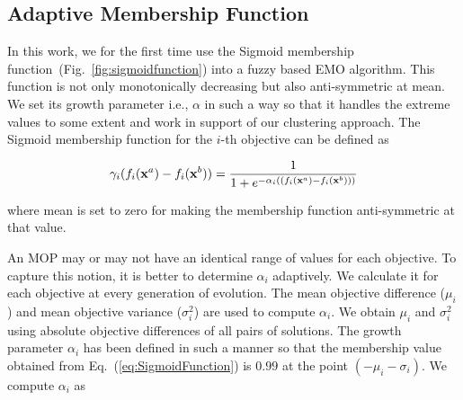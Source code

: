 \documentclass[review]{elsarticle}
\begin{document}
\subsection{Adaptive Membership Function}
\label{subsec:membershipFunction}



In this work, we for the first time use the Sigmoid membership function~(Fig.~\ref{fig:sigmoidfunction}) into a
fuzzy based EMO algorithm. This
function is not only monotonically decreasing but also anti-symmetric at mean. We set its growth parameter i.e.,
$\alpha$ in such a way so that it handles the extreme values to some extent 
and work in support of our clustering approach.
The Sigmoid membership function for the $i$-th objective can be defined as 

\begin{equation} \label{eq:SigmoidFunction}
	\gamma_i(f_i({\bf x}^a)-f_i({\bf x}^b))=\frac{1}{1+e^{-\alpha_i((f_i({\bf x}^a)-f_i({\bf x}^b)))}}
\end{equation}

\noindent where mean is set to zero for making the membership function anti-symmetric at that value.

An MOP may or may not have an identical range of values for each objective. To capture this notion, it is better to determine $\alpha_i$ adaptively. We calculate it for each objective at every generation of evolution. The mean objective difference ($\mu_i$) and mean objective  variance ($\sigma_i^2$)
are used to compute $\alpha_i$. We obtain $\mu_i$ and $\sigma_i^2$ using  absolute objective differences of all pairs of solutions.
%
%
%
The growth parameter $\alpha_i$  has been defined in such a manner so that the membership value obtained from Eq.~(\ref{eq:SigmoidFunction}) is $0.99$ at
the point $(-\mu_i-\sigma_i)$. We compute  $\alpha_i$ as
\end{document}
